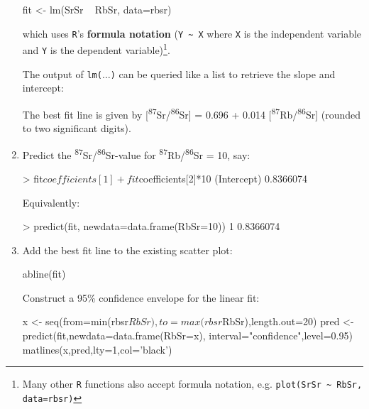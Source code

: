 \begin{enumerate}
\begin{script}[firstnumber=7]
fit <- lm(SrSr ~ RbSr, data=rbsr)
\end{script}

\noindent which uses \texttt{R}'s \textbf{formula notation}
(\verb|Y ~ X| where \texttt{X} is the independent variable and
\texttt{Y} is the dependent variable)\footnote{Many other \texttt{R}
  functions also accept formula notation, e.g. \texttt{plot(SrSr
    \textasciitilde{} RbSr, data=rbsr)}}.

The output of \texttt{lm($\ldots$)} can be queried like a list to
retrieve the slope and intercept:


The best fit line is given by
[\textsuperscript{87}Sr/\textsuperscript{86}Sr] = 0.696 + 0.014
[\textsuperscript{87}Rb/\textsuperscript{86}Sr] (rounded to two
significant digits).

\item Predict the \textsuperscript{87}Sr/\textsuperscript{86}Sr-value
  for \textsuperscript{87}Rb/\textsuperscript{86}Sr = 10, say:
  
\begin{console}
> fit$coefficients[1] + fit$coefficients[2]*10
(Intercept)
  0.8366074 
\end{console}

Equivalently:

\begin{console}
> predict(fit, newdata=data.frame(RbSr=10))
        1 
0.8366074
\end{console}

\item Add the best fit line to the existing scatter plot:

\begin{script}[firstnumber=8]
abline(fit)
\end{script}

Construct a 95\% confidence envelope for the linear fit:

\begin{script}[firstnumber=9]
x <- seq(from=min(rbsr$RbSr),to=max(rbsr$RbSr),length.out=20)
pred <- predict(fit,newdata=data.frame(RbSr=x),
                interval="confidence",level=0.95)
matlines(x,pred,lty=1,col='black')
\end{script}


\end{enumerate}
